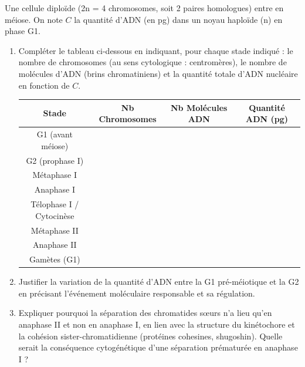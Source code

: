 \documentclass[11pt]{article}
\begin{document}
\begin{exercice}
Une cellule diploïde (2n = 4 chromosomes, soit 2 paires homologues) entre en méiose. On note $C$ la quantité d'ADN (en pg) dans un noyau haploïde (n) en phase G1.
\begin{enumerate}
    \item Compléter le tableau ci-dessous en indiquant, pour chaque stade indiqué : le nombre de chromosomes (au sens cytologique : centromères), le nombre de molécules d'ADN (brins chromatiniens) et la quantité totale d'ADN nucléaire en fonction de $C$.
    \begin{center}
    \begin{tabular}{|c|c|c|c|}
    \hline
    \textbf{Stade} & \textbf{Nb Chromosomes} & \textbf{Nb Molécules ADN} & \textbf{Quantité ADN (pg)} \\
    \hline
    G1 (avant méiose) & & & \\
    \hline
    G2 (prophase I) & & & \\
    \hline
    Métaphase I & & & \\
    \hline
    Anaphase I & & & \\
    \hline
    Télophase I / Cytocinèse & & & \\
    \hline
    Métaphase II & & & \\
    \hline
    Anaphase II & & & \\
    \hline
    Gamètes (G1) & & & \\
    \hline
    \end{tabular}
    \end{center}
    \item Justifier la variation de la quantité d'ADN entre la G1 pré-méiotique et la G2 en précisant l'événement moléculaire responsable et sa régulation.
    \item Expliquer pourquoi la séparation des chromatides sœurs n'a lieu qu'en anaphase II et non en anaphase I, en lien avec la structure du kinétochore et la cohésion sister-chromatidienne (protéines cohesines, shugoshin). Quelle serait la conséquence cytogénétique d'une séparation prématurée en anaphase I ?
\end{enumerate}
\end{exercice}
\end{document}
